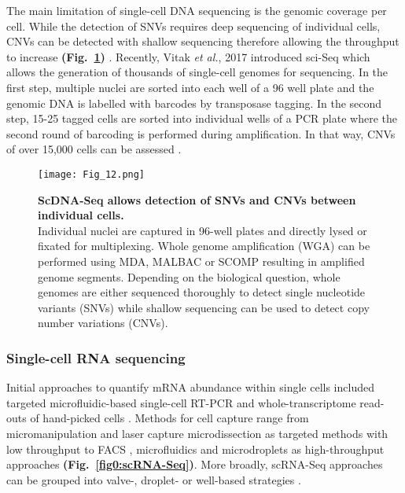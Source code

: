 The main limitation of single-cell DNA sequencing is the genomic coverage per cell. While the detection of SNVs requires deep sequencing of individual cells, CNVs can be detected with shallow sequencing therefore allowing the throughput to increase \textbf{(Fig.~\ref{fig0:scDNA-Seq})} \citep{Knouse2016, Baslan2015}. Recently, Vitak \emph{et al.}, 2017 introduced \gls{sci-Seq} which allows the generation of thousands of single-cell genomes for sequencing. In the first step, multiple nuclei are sorted into each well of a 96 well plate and the genomic DNA is labelled with barcodes by transposase tagging. In the second step, 15-25 tagged cells are sorted into individual wells of a PCR plate where the second round of barcoding is performed during amplification. In that way, CNVs of over 15,000 cells can be assessed \citep{Vitak2017}.

\begin{figure}[!h]
\centering
\texttt{[image: Fig\_12.png]}
\caption[ScDNA-Seq allows detection of SNVs and CNVs between individual cells]{\textbf{ScDNA-Seq allows detection of SNVs and CNVs between individual cells.}\\
Individual nuclei are captured in 96-well plates and directly lysed or fixated for multiplexing. Whole genome amplification (WGA) can be performed using MDA, MALBAC or SCOMP resulting in amplified genome segments. Depending on the biological question, whole genomes are either sequenced thoroughly to detect single nucleotide variants (SNVs) while shallow sequencing can be used to detect copy number variations (CNVs).}
\label{fig0:scDNA-Seq}
\end{figure}

\vspace{-5mm}

\subsubsection{Single-cell RNA sequencing}

Initial approaches to quantify mRNA abundance within single cells included targeted microfluidic-based single-cell \gls{RT-PCR} \citep{Warren2006} and whole-transcriptome read-outs of hand-picked cells \citep{Tang2009}. Methods for cell capture range from micromanipulation \citep{Grindberg2014} and laser capture microdissection \citep{Frumkin2008} as targeted methods with low throughput to  \gls{FACS} \citep{Hayashi2010, Dalerba2011, Jaitin2014}, microfluidics \citep{Trapnell2014, Treutlein2014} and microdroplets \citep{Klein2015, Macosko2015} as high-throughput approaches \textbf{(Fig.~\ref{fig0:scRNA-Seq})}. More broadly, \gls{scRNA-Seq} approaches can be grouped into valve-, droplet- or well-based strategies \citep{Prakadan2017}. \\

